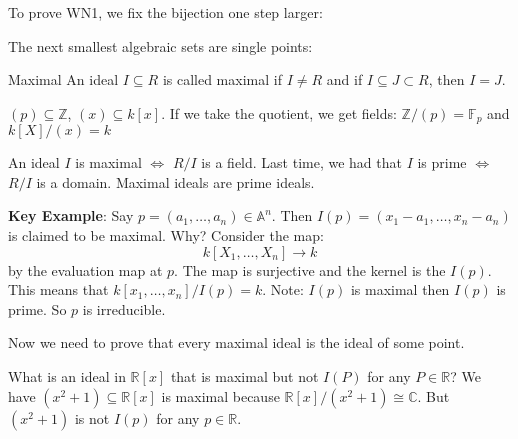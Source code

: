 \documentclass{report}
\begin{document}
To prove WN1, we fix the bijection one step larger:
    \begin{center}
    \end{center} 
The next smallest algebraic sets are single points:
    \begin{center}
    \end{center}
\begin{definition}{Maximal}
    An ideal $I \subseteq R$ is called maximal if $I \neq R$ and if $I \subseteq J \subset R$, then $I = J$.
\end{definition}

\begin{examples}
    \begin{example}
        $(p) \subseteq \mathbb{Z}$, $(x) \subseteq k[x]$. If we take the quotient, we get fields: $\mathbb{Z}/(p) = \mathbb{F}_{p}$ and $k[X]/(x) = k$
    \end{example}
\end{examples}

An ideal $I$ is maximal $\iff $ $R/I$ is a field. Last time, we had that $I$ is prime $\iff $ $R/I$ is a domain. Maximal ideals are prime ideals.

\textbf{Key Example}: Say $p = (a_{1}, \ldots, a_{n}) \in \mathbb{A}^{n}$. Then $I(p) = (x_{1} - a_{1}, \ldots, x_{n} - a_{n})$ is claimed to be maximal. Why? Consider the map:
    \begin{equation*}
        k[X_{1}, \ldots, X_{n}] \rightarrow k
    \end{equation*}
by the evaluation map at $p$. The map is surjective and the kernel is the $I(p)$. This means that $k[x_{1}, \ldots, x_{n}]/I(p) = k$. Note: $I(p)$ is maximal then $I(p)$ is prime. So $p$ is irreducible.

Now we need to prove that every maximal ideal is the ideal of some point. 
    \begin{examples}
        \begin{example}
            What is an ideal in $\mathbb{R}[x]$ that is maximal but not $I(P)$ for any $P \in \mathbb{R}$? We have $(x^{2} + 1) \subseteq \mathbb{R}[x]$ is maximal because $\mathbb{R}[x]/(x^{2} + 1) \cong \mathbb{C}$. But $(x^{2} + 1)$ is not $I(p)$ for any $p \in \mathbb{R}$.
        \end{example} 
    \end{examples}
\end{document}
